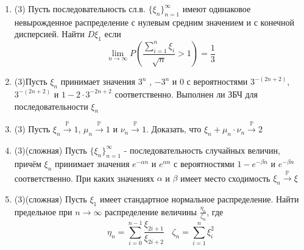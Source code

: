 \documentclass[a4paper, 14pt]{extarticle}
\begin{document}
\begin{enumerate}
\item (3) Пусть последовательность сл.в. $\{\xi_n\}_{n=1}^{\infty}$ имеют одинаковое 
невырожденное распределение с нулевым средним значением и с конечной дисперсией. 
Найти $D\xi_1$ если
$$\lim_{n\to\infty}P(\frac{\sum_{i=1}^{n}\xi_i}{\sqrt{n}} > 1) = \frac{1}{3}$$

\item (3)Пусть $\xi_n$ принимает значения $3^n$ , $-3^n$ и 0 с вероятностями
$3^{-(2n+2)}$, $3^{-(2n+2)}$ и $1 - 2 \cdot 3^{-2n+2}$ соответственно. Выполнен ли ЗБЧ для
последовательности $\xi_n$ 

\item (3) Пусть $\xi_n \overset{\mathbb{P}}{\to} 1$, $\mu_n \overset{\mathbb{P}}{\to} 1$ и 
$\nu_n \overset{\mathbb{P}}{\to} 1$.
Доказать, что $\xi_n + \mu_n \cdot \nu_n \overset{\mathbb{P}}{\to}2$

\item (3)(сложная) Пусть $\{\xi_n\}_{n=1}^{\infty}$ - последовательность случайных величин, 
причём $\xi_n$ принимает значения $e^{-\alpha n}$ и $e^{\alpha n}$ с вероятностями $1 - e^{-\beta n}$ и $e^{-\beta n}$
соответственно. При каких значениях $\alpha$ и $\beta$ имеет место сходимость $\xi_n \overset{\mathbb{P}}{\to} \xi$

\item (3)(сложная) Пусть $\xi_1$ имеет стандартное нормальное распределение. Найти
предельное при $n \to \infty$ распределение величины $\frac{\eta_n}{\zeta_n}$, где
$$\eta_n = \sum_{i=0}^{n-1}\frac{\xi_{2i+1}}{\xi_{2i+2}}~~~~\zeta_n = \sum_{i=1}^{n}\xi_i^2$$



\end{enumerate}
\end{document}
